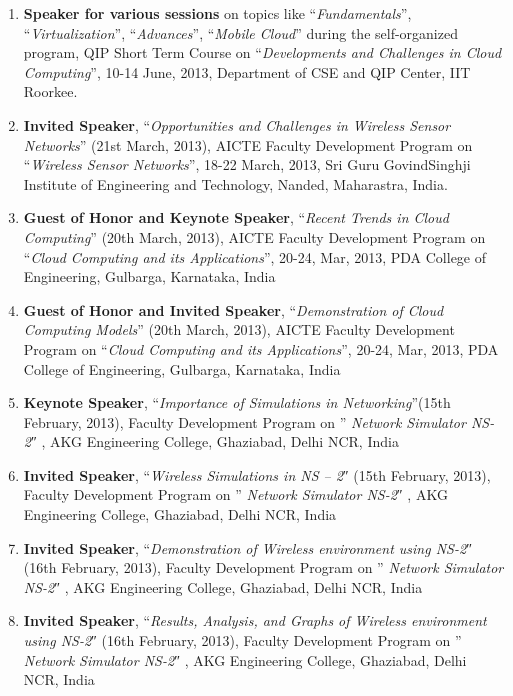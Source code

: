 \begin{enumerate}
\item
\textbf{Speaker for various sessions} on topics like “\textit{Fundamentals}”, “\textit{Virtualization}”, “\textit{Advances}”, “\textit{Mobile Cloud}” during the self-organized program, QIP Short Term Course on “\textit{Developments and Challenges in Cloud Computing}”, 10-14 June, 2013, Department of CSE and QIP Center, IIT Roorkee.

\item
\textbf{Invited Speaker}, “\textit{Opportunities and Challenges in Wireless Sensor Networks}” (21st March, 2013), AICTE Faculty Development Program on “\textit{Wireless Sensor Networks}”, 18-22 March, 2013, Sri Guru GovindSinghji Institute of Engineering and Technology, Nanded, Maharastra, India.

\item
\textbf{Guest of Honor and Keynote Speaker}, “\textit{Recent Trends in Cloud Computing}” (20th March, 2013), AICTE Faculty Development Program on “\textit{Cloud Computing and its Applications}”, 20-24, Mar, 2013, PDA College of Engineering, Gulbarga, Karnataka, India

\item
\textbf{Guest of Honor and Invited Speaker}, “\textit{Demonstration of Cloud Computing Models}” (20th March, 2013), AICTE Faculty Development Program on “\textit{Cloud Computing and its Applications}”, 20-24, Mar, 2013, PDA College of Engineering, Gulbarga, Karnataka, India

\item
\textbf{Keynote Speaker}, “\textit{Importance of Simulations in Networking}”(15th February, 2013), Faculty Development Program on ” \textit{Network Simulator NS-2}″ , AKG Engineering College, Ghaziabad, Delhi NCR, India

\item
\textbf{Invited Speaker}, “\textit{Wireless Simulations in NS – 2}″ (15th February, 2013), Faculty Development Program on ” \textit{Network Simulator NS-2}″ , AKG Engineering College, Ghaziabad, Delhi NCR, India

\item
\textbf{Invited Speaker}, “\textit{Demonstration of Wireless environment using NS-2}″ (16th February, 2013), Faculty Development Program on ” \textit{Network Simulator NS-2}″ , AKG Engineering College, Ghaziabad, Delhi NCR, India

\item
\textbf{Invited Speaker}, “\textit{Results, Analysis, and Graphs of Wireless environment using NS-2}″ (16th February, 2013), Faculty Development Program on ” \textit{Network Simulator NS-2}″ , AKG Engineering College, Ghaziabad, Delhi NCR, India


\end{enumerate}
